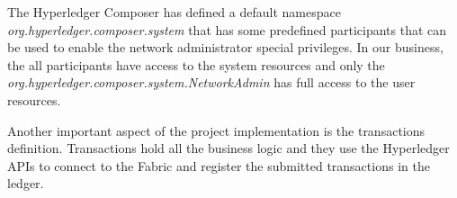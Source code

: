 The Hyperledger Composer has defined a default namespace \emph{org.hyperledger.composer.system} that has some predefined participants that can be used to enable the network administrator special privileges. In our business, the all participants have access to the system resources and only the \emph{org.hyperledger.composer.system.NetworkAdmin} has full access to the user resources.

Another important aspect of the project implementation is the transactions definition. Transactions hold all the business logic and they use the Hyperledger APIs to connect to the Fabric and register the submitted transactions in the ledger.









